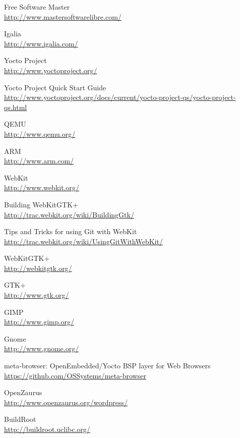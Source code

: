 \documentclass[a4paper,11pt,openany]{report}
\begin{document}
\begin{thebibliography}{ZZ}

Free Software Master\\
\url{http://www.mastersoftwarelibre.com/}

Igalia\\
\url{http://www.igalia.com/}

Yocto Project\\
\url{http://www.yoctoproject.org/}

Yocto Project Quick Start Guide\\
\url{http://www.yoctoproject.org/docs/current/yocto-project-qs/yocto-project-qs.html}

QEMU\\
\url{http://www.qemu.org/}

ARM\\
\url{http://www.arm.com/}

WebKit\\
\url{http://www.webkit.org/}

Building WebKitGTK+\\
\url{http://trac.webkit.org/wiki/BuildingGtk/}

Tips and Tricks for using Git with WebKit\\
\url{http://trac.webkit.org/wiki/UsingGitWithWebKit/}

WebKitGTK+\\
\url{http://webkitgtk.org/}

GTK+\\
\url{http://www.gtk.org/}

GIMP\\
\url{http://www.gimp.org/}

Gnome\\
\url{http://www.gnome.org/}

meta-browser: OpenEmbedded/Yocto BSP layer for Web Browsers\\
\url{https://github.com/OSSystems/meta-browser}

OpenZaurus\\
\url{http://www.openzaurus.org/wordpress/}

BuildRoot\\
\url{http://buildroot.uclibc.org/}


\end{thebibliography}
\end{document}

